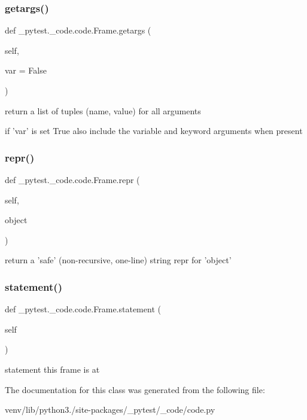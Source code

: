 \subsubsection{\texorpdfstring{getargs()}{getargs()}}
{\footnotesize\ttfamily def \+\_\+pytest.\+\_\+code.\+code.\+Frame.\+getargs (\begin{DoxyParamCaption}\item[{}]{self,  }\item[{}]{var = {\ttfamily False} }\end{DoxyParamCaption})}

\begin{DoxyVerb}return a list of tuples (name, value) for all arguments

    if 'var' is set True also include the variable and keyword
    arguments when present
\end{DoxyVerb}
 \mbox{\label{class__pytest_1_1__code_1_1code_1_1_frame_a6d1b4ebb61e4a1dd4ac54564f7c54011}} 
\subsubsection{\texorpdfstring{repr()}{repr()}}
{\footnotesize\ttfamily def \+\_\+pytest.\+\_\+code.\+code.\+Frame.\+repr (\begin{DoxyParamCaption}\item[{}]{self,  }\item[{}]{object }\end{DoxyParamCaption})}

\begin{DoxyVerb}return a 'safe' (non-recursive, one-line) string repr for 'object'
\end{DoxyVerb}
 \mbox{\label{class__pytest_1_1__code_1_1code_1_1_frame_ad23548ae1a23c439708b93a5042fefea}} 
\subsubsection{\texorpdfstring{statement()}{statement()}}
{\footnotesize\ttfamily def \+\_\+pytest.\+\_\+code.\+code.\+Frame.\+statement (\begin{DoxyParamCaption}\item[{}]{self }\end{DoxyParamCaption})}

\begin{DoxyVerb}statement this frame is at \end{DoxyVerb}
 

The documentation for this class was generated from the following file\+:\begin{DoxyCompactItemize}
\item 
venv/lib/python3./site-\/packages/\+\_\+pytest/\+\_\+code/code.\+py\end{DoxyCompactItemize}
